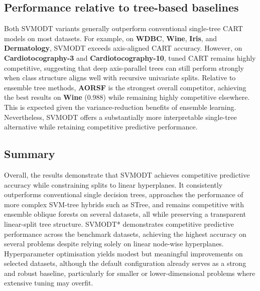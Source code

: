 \subsection{Performance relative to tree-based baselines}\label{performance-relative-to-tree-based-baselines}

Both SVMODT variants generally outperform conventional single-tree CART models on most datasets. For example, on \textbf{WDBC}, \textbf{Wine}, \textbf{Iris}, and \textbf{Dermatology}, SVMODT exceeds axis-aligned CART accuracy. However, on \textbf{Cardiotocography-3} and \textbf{Cardiotocography-10}, tuned CART remains highly competitive, suggesting that deep axis-parallel trees can still perform strongly when class structure aligns well with recursive univariate splits. Relative to ensemble tree methods, \textbf{AORSF} is the strongest overall competitor, achieving the best results on \textbf{Wine} (0.988) while remaining highly competitive elsewhere. This is expected given the variance-reduction benefits of ensemble learning. Nevertheless, SVMODT offers a substantially more interpretable single-tree alternative while retaining competitive predictive performance.

\subsection{Summary}\label{summary}

Overall, the results demonstrate that SVMODT achieves competitive predictive accuracy while constraining splits to linear hyperplanes. It consistently outperforms conventional single decision trees, approaches the performance of more complex SVM-tree hybrids such as STree, and remains competitive with ensemble oblique forests on several datasets, all while preserving a transparent linear-split tree structure. SVMODT* demonstrates competitive predictive performance across the benchmark datasets, achieving the highest accuracy on several problems despite relying solely on linear node-wise hyperplanes. Hyperparameter optimisation yields modest but meaningful improvements on selected datasets, although the default configuration already serves as a strong and robust baseline, particularly for smaller or lower-dimensional problems where extensive tuning may overfit.

